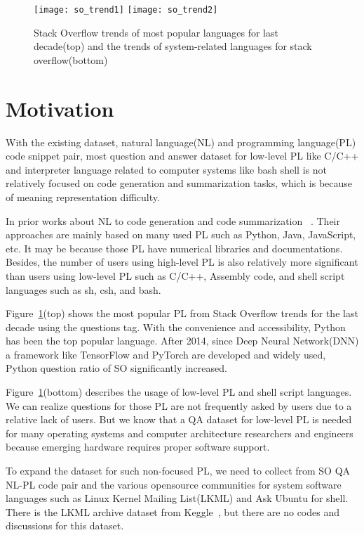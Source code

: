 \begin{figure}[t]
\centering
\texttt{[image: so\_trend1]}
\texttt{[image: so\_trend2]}
\caption{Stack Overflow trends of most popular languages
	for last decade(top) and the trends of system-related languages for
	stack overflow(bottom)}
\label{fig:so_trend}
\end{figure}

\section{Motivation}
With the existing dataset, natural language(NL) and programming language(PL)
code snippet pair, most question and answer dataset for low-level PL like C/C++
and
interpreter language related to computer systems like bash shell is not
relatively focused on code generation
and summarization tasks, which is because of meaning representation difficulty.

In prior works about NL to code generation and code summarization
~\cite{xu20aclcodegen, orlanski2021reading, yin2018mining, parvez2021retrieval,
feng2020codebert}. Their approaches are mainly
based on many used PL such as Python, Java, JavaScript, etc. It may be because
those PL have numerical libraries and documentations. Besides, the number of
users using high-level PL is also relatively more significant than users
using low-level PL such as C/C++, Assembly code, and shell
script languages such as sh, csh, and bash.

Figure~\ref{fig:so_trend}(top) shows the most popular PL from Stack Overflow trends for the last
decade using the questions tag. With
the convenience and accessibility, Python has been the top popular language.
After 2014, since Deep Neural Network(DNN)
a framework like TensorFlow and PyTorch are developed and
widely used, Python question ratio of SO significantly increased.

Figure~\ref{fig:so_trend}(bottom) describes the usage of low-level PL and
shell script languages. We can realize questions for those PL
are not frequently asked by users due to a relative lack of
users. But we know that a QA dataset for low-level PL is
needed for many operating systems and computer architecture
researchers and engineers because emerging hardware requires proper software
support.

To expand the dataset for such non-focused PL, we need to
collect from SO QA NL-PL code pair and the various opensource communities for
system software languages
such as Linux Kernel Mailing List(LKML) and Ask Ubuntu
for shell. There is the LKML archive dataset from Keggle~\cite{miasoedov2017lkmlarchive}, but
there are no codes and discussions for this
dataset.

